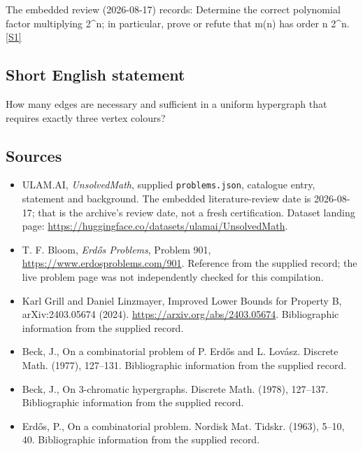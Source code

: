 \documentclass[11pt,a4paper]{article}
\newcommand{\sref}[2]{\hyperlink{source:#1:#2}{[S#2]}}
\begin{document}
The embedded review (2026-08-17) records: Determine the correct polynomial factor multiplying 2\textasciicircum{}n; in particular, prove or refute that m(n) has order n 2\textasciicircum{}n. \sref{statement}{1}

\subsection{Short English statement}

How many edges are necessary and sufficient in a uniform hypergraph that requires exactly three vertex colours?

\subsection{Sources}

{\small

\begin{itemize}

\item[\hypertarget{source:statement:1}{S1}] ULAM.AI, \emph{UnsolvedMath}, supplied \texttt{problems.json}, catalogue entry, statement and background. The embedded literature-review date is 2026-08-17; that is the archive’s review date, not a fresh certification. Dataset landing page: \url{https://huggingface.co/datasets/ulamai/UnsolvedMath}.

\item[\hypertarget{source:statement:2}{S2}] T. F. Bloom, \emph{Erdős Problems}, Problem 901, \url{https://www.erdosproblems.com/901}. Reference from the supplied record; the live problem page was not independently checked for this compilation.

\item[\hypertarget{source:statement:3}{S3}] Karl Grill and Daniel Linzmayer, Improved Lower Bounds for Property B, arXiv:2403.05674 (2024). \url{https://arxiv.org/abs/2403.05674}. Bibliographic information from the supplied record.

\item[\hypertarget{source:statement:4}{S4}] Beck, J., On a combinatorial problem of {P}. {E}rd\H{o}s and {L}. {L}ov\'asz. Discrete Math. (1977), 127--131. Bibliographic information from the supplied record.

\item[\hypertarget{source:statement:5}{S5}] Beck, J., On {$3$}-chromatic hypergraphs. Discrete Math. (1978), 127--137. Bibliographic information from the supplied record.

\item[\hypertarget{source:statement:6}{S6}] Erd\H{o}s, P., On a combinatorial problem. Nordisk Mat. Tidskr. (1963), 5--10, 40. Bibliographic information from the supplied record.

\end{itemize}

}

\label{end:statement}
\end{document}

